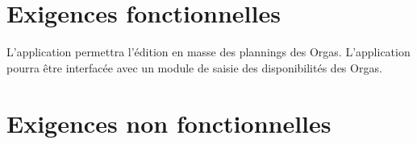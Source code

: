 \section{Exigences fonctionnelles}
\fonction{}L'application permettra l'édition en masse des plannings des Orgas.
\fonction{}L'application pourra être interfacée avec un module de saisie des disponibilités des Orgas.
\section{Exigences non fonctionnelles}